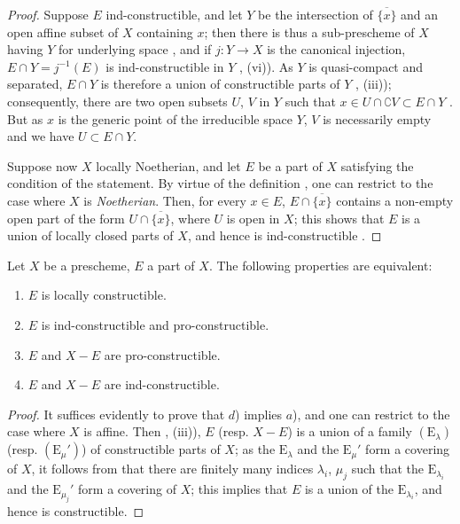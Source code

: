 \begin{proof}
Suppose $E$ ind-constructible, and let $Y$ be the intersection of $\overline{\{x\}}$ and an open affine subset of $X$ containing $x$; then there is thus a sub-prescheme of $X$ having $Y$ for underlying space , and if $j:Y\to X$ is the canonical injection, $E\cap Y=j^{-1}(E)$ is ind-constructible in $Y$ , (vi)).
As $Y$ is quasi-compact and separated, $E\cap Y$ is therefore a union of constructible parts of $Y$ , (iii)); consequently, there are two open subsets $U$, $V$ in $Y$ such that $x\in U\cap\complement V\subset E\cap Y$ .
But as $x$ is the generic point of the irreducible space $Y$, $V$ is necessarily empty and we have $U\subset E\cap Y$.

Suppose now $X$ locally Noetherian, and let $E$ be a part of $X$ satisfying the condition of the statement.
By virtue of the definition , one can restrict to the case where $X$ is \emph{Noetherian}.
Then, for every $x\in E$, $E\cap\overline{\{x\}}$ contains a non-empty open part of the form $U\cap\overline{\{x\}}$, where $U$ is open in $X$; this shows that $E$ is a union of locally closed parts of $X$, and hence is ind-constructible .
\end{proof}

\begin{proposition}[1.9.11]
\label{IV.1.9.11}
Let $X$ be a prescheme, $E$ a part of $X$.
The following properties are equivalent:
\begin{enumerate}
  \item[\rm a)] $E$ is locally constructible.
  \item[\rm b)] $E$ is ind-constructible and pro-constructible.
  \item[\rm c)] $E$ and $X-E$ are pro-constructible.
  \item[\rm d)] $E$ and $X-E$ are ind-constructible.
\end{enumerate}
\end{proposition}

\begin{proof}
It suffices evidently to prove that $d$) implies $a$), and one can restrict to the case where $X$ is affine.
Then , (iii)), $E$ (resp. $X-E$) is a union of a family $(\mathrm{E}_\lambda)$ (resp. $(\mathrm{E}_\mu')$) of constructible parts of $X$; as the $\mathrm{E}_\lambda$ and the $\mathrm{E}_\mu'$ form a covering of $X$, it follows from  that there are finitely many indices $\lambda_i$, $\mu_j$ such that the $\mathrm{E}_{\lambda_i}$ and the $\mathrm{E}_{\mu_j}'$ form a covering of $X$; this implies that $E$ is a union of the $\mathrm{E}_{\lambda_i}$, and hence is constructible.
\end{proof}

